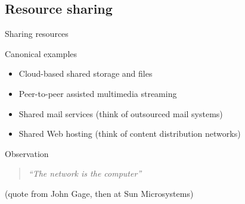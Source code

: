 \subsection{Resource sharing}
\begin{slide}{Sharing resources}
  \begin{exampleblock}{Canonical examples}
    \begin{itemize}\firmlist
    \item Cloud-based shared storage and files
    \item Peer-to-peer assisted multimedia streaming
    \item Shared mail services (think of outsourced mail systems)
    \item Shared Web hosting (think of content distribution networks)
    \end{itemize}
  \end{exampleblock}
  \begin{block}{Observation}
    \begin{quote}\itshape
      ``The network is the computer''
    \end{quote}
    (quote from John Gage, then at Sun Microsystems)
  \end{block}
\end{slide}
